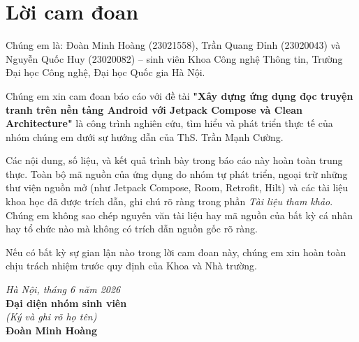 \chapter*{Lời cam đoan}

Chúng em là: Đoàn Minh Hoàng (23021558), Trần Quang Đỉnh (23020043) và Nguyễn Quốc Huy (23020082) – sinh viên Khoa Công nghệ Thông tin, Trường Đại học Công nghệ, Đại học Quốc gia Hà Nội.

Chúng em xin cam đoan báo cáo với đề tài \textbf{"Xây dựng ứng dụng đọc truyện tranh trên nền tảng Android với Jetpack Compose và Clean Architecture"} là công trình nghiên cứu, tìm hiểu và phát triển thực tế của nhóm chúng em dưới sự hướng dẫn của ThS. Trần Mạnh Cường.

Các nội dung, số liệu, và kết quả trình bày trong báo cáo này hoàn toàn trung thực. Toàn bộ mã nguồn của ứng dụng do nhóm tự phát triển, ngoại trừ những thư viện nguồn mở (như Jetpack Compose, Room, Retrofit, Hilt) và các tài liệu khoa học đã được trích dẫn, ghi chú rõ ràng trong phần \textit{Tài liệu tham khảo}. Chúng em không sao chép nguyên văn tài liệu hay mã nguồn của bất kỳ cá nhân hay tổ chức nào mà không có trích dẫn nguồn gốc rõ ràng.

Nếu có bất kỳ sự gian lận nào trong lời cam đoan này, chúng em xin hoàn toàn chịu trách nhiệm trước quy định của Khoa và Nhà trường.

\begin{flushright}
\textit{Hà Nội, tháng 6 năm 2026}\\
\textbf{Đại diện nhóm sinh viên}\\
\vspace{1.5cm}
\textit{(Ký và ghi rõ họ tên)}\\
\vspace{1.5cm}
\textbf{Đoàn Minh Hoàng}
\end{flushright}